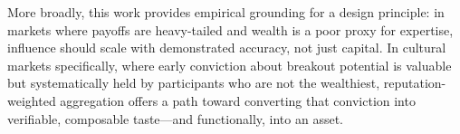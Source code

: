 \documentclass[conference]{IEEEtran}
\begin{document}
More broadly, this work provides empirical grounding for a design principle: in markets where payoffs are heavy-tailed and wealth is a poor proxy for expertise, influence should scale with demonstrated accuracy, not just capital. In cultural markets specifically, where early conviction about breakout potential is valuable but systematically held by participants who are not the wealthiest, reputation-weighted aggregation offers a path toward converting that conviction into verifiable, composable taste---and functionally, into an asset.


\balance


\end{document}
